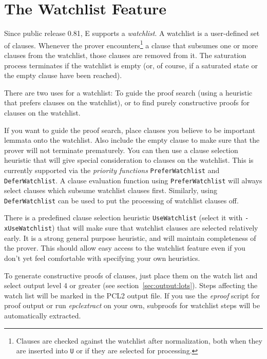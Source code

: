 \documentclass{report}
\begin{document}
\section{The Watchlist Feature}
\label{sec:options:watchlist}

Since public release 0.81, E supports a \emph{watchlist}. A watchlist
is a user-defined set of clauses. Whenever the prover
encounters\footnote{Clauses are checked against the watchlist after
  normalization, both when they are inserted into \texttt{U} or if
  they are selected for processing.} a clause that subsumes one or
more clauses from the watchlist, those clauses are removed from it.
The saturation process terminates if the watchlist is empty (or, of
course, if a saturated state or the empty clause have been reached).

There are two uses for a watchlist: To guide the proof search (using a
heuristic that prefers clauses on the watchlist), or to find purely
constructive proofs for clauses on the watchlist.

If you want to guide the proof search, place clauses you believe to be
important lemmata onto the watchlist. Also include the empty clause to
make sure that the prover will not terminate prematurely.  You can
then use a clause selection heuristic that will give special
consideration to clauses on the watchlist. This is currently supported
via the \emph{priority functions} \texttt{PreferWatchlist} and
\texttt{DeferWatchlist}. A clause evaluation function using
\texttt{PreferWatchlist} will always select clauses which subsume
watchlist clauses first. Similarly, using \texttt{DeferWatchlist} can
be used to put the processing of watchlist clauses off.

There is a predefined clause selection heuristic \texttt{UseWatchlist}
(select it with \texttt{-xUseWatchlist}) that will make sure that
watchlist clauses are selected relatively early. It is a strong
general purpose heuristic, and will maintain completeness of the
prover. This should allow easy access to the watchlist feature even
if you don't yet feel comfortable with specifying your own
heuristics.

To generate constructive proofs of clauses, just place them on the
watch list and select output level 4 or greater (see
section~\ref{sec:output:lots}). Steps affecting the watch list will be
marked in the PCL2 output file. If you use the \emph{eproof} script
for proof output or run \emph{epclextract} on your own, subproofs for
watchlist steps will be automatically extracted.
\end{document}
